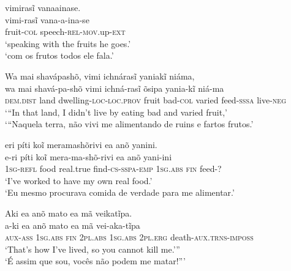 \documentclass[output=paper,
modfonts,nonflat
]{langsci/langscibook}
\begin{document}
\ea vimirasĩ vanaainase. \\[.3em]
\gll vimi-rasĩ          vana-a-ina-se                           \\
     fruit-\textsc{col} speech-\textsc{rel-mov}.up-\textsc{ext} \\
\glt `speaking with the fruits he goes.'\footnotemark \\
`com os frutos todos ele fala.'\\
\z


\newpage 
\ea  Wa mai shavápashõ, vimi ichnárasĩ yaniakĩ niáma, \\[.3em]
\gll wa                mai  shavá-pa-shõ                   vimi  ichná-rasĩ       õsipa  yania-kĩ           niá-ma            \\
     \textsc{dem.dist} land dwelling-\textsc{loc-loc.prov} fruit bad-\textsc{col} varied feed-\textsc{sssa} live-\textsc{neg} \\
\glt ‘“In that land, I didn't live by eating bad and varied fruit,' \\
`“Naquela terra, não vivi me alimentando de ruins e fartos frutos.'\\
\z

\ea eri píti koĩ meramashõrivi ea anõ yanini. \\[.3em]
\gll e-ri              píti koĩ       mera-ma-shõ-rivi          ea               anõ          yani-ini        \\
     1\textsc{sg-refl} food real.true find-\textsc{cs-sspa-emp} \textsc{1sg.abs} \textsc{fin} feed-\textsc{?} \\
\glt `I've worked to have my own real food.' \\
`Eu mesmo procurava comida de verdade para me alimentar.' \\
\z

\ea Aki ea anõ mato ea mã veikatĩpa. \\[.3em]
\gll a-ki             ea               anõ          mato            ea               mã              vei-aka-tĩpa                   \\
     \textsc{aux-ass} \textsc{1sg.abs} \textsc{fin} \textsc{2pl.abs} \textsc{1sg.abs} \textsc{2pl.erg} death-\textsc{aux.trns-imposs} \\
\glt `That's how I've lived, so you cannot kill me.''' \\
`É assim que sou, vocês não podem me matar!”'\\
\z
\end{document}
